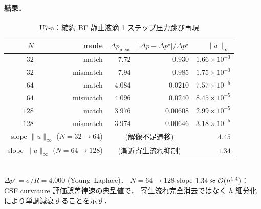 \paragraph{結果．}

\begin{table}[!htbp]
\caption{U7-a：縮約 BF 静止液滴 1 ステップ圧力跳び再現}
\label{tab:U7_bf}
\centering\small
\begin{tabular}{r r r r r}
\toprule
$N$ & mode & $\Delta p_{\mathrm{meas}}$ & $|\Delta p - \Delta p^\star|/\Delta p^\star$ & $\|u\|_\infty$ \\
\midrule
$32$  & match    & $7.72$  & $0.930$    & $1.66\times 10^{-3}$ \\
$32$  & mismatch & $7.94$  & $0.985$    & $1.75\times 10^{-3}$ \\
$64$  & match    & $4.084$ & $0.0210$   & $7.57\times 10^{-5}$ \\
$64$  & mismatch & $4.096$ & $0.0240$   & $8.45\times 10^{-5}$ \\
$128$ & match    & $3.976$ & $0.00608$  & $2.99\times 10^{-5}$ \\
$128$ & mismatch & $3.974$ & $0.00646$  & $3.18\times 10^{-5}$ \\
\midrule
\multicolumn{2}{r}{slope $\|u\|_\infty$ ($N=32\!\to\!64$)} & \multicolumn{2}{c}{(解像不足遷移)} & $\mathbf{4.45}$ \\
\multicolumn{2}{r}{slope $\|u\|_\infty$ ($N=64\!\to\!128$)} & \multicolumn{2}{c}{(漸近寄生流れ抑制)} & $\mathbf{1.34}$ \\
\bottomrule
\end{tabular}
\\[2pt]
{\footnotesize $\Delta p^\star = \sigma/R = 4.000$ (Young--Laplace)．
$N=64\!\to\!128$ slope $1.34 \approx \mathcal{O}(h^{1.4})$：CSF curvature 評価誤差律速の典型値で，
寄生流れ完全消去ではなく $h$ 細分化により単調減衰することを示す．}
\end{table}

